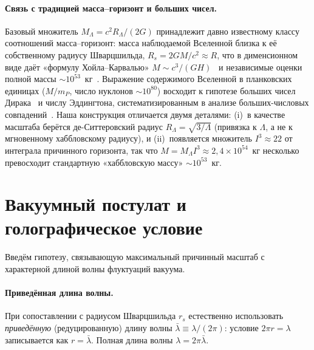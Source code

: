 \documentclass[12pt,a4paper]{article}
\begin{document}
\paragraph{Связь с традицией масса--горизонт и больших чисел.} Базовый множитель $M_\Lambda = c^2 R_\Lambda/(2G)$ принадлежит давно известному классу соотношений масса--горизонт: масса наблюдаемой Вселенной близка к её собственному радиусу Шварцшильда, $R_s = 2GM/c^2 \approx R$, что в дименсионном виде даёт «формулу Хойла--Карвалью» $M \sim c^3/(GH)$~\cite{Carvalho1995} и независимые оценки полной массы $\sim10^{53}$~кг~\cite{Valev2014}. Выражение содержимого Вселенной в планковских единицах ($M/m_P$, число нуклонов $\sim10^{80}$) восходит к гипотезе больших чисел Дирака~\cite{Dirac1938} и числу Эддингтона, систематизированным в анализе больших-числовых совпадений~\cite{CarrRees1979}. Наша конструкция отличается двумя деталями: (i)~в качестве масштаба берётся де-Ситтеровский радиус $R_\Lambda=\sqrt{3/\Lambda}$ (привязка к $\Lambda$, а не к мгновенному хаббловскому радиусу), и (ii)~появляется множитель $I^3\approx22$ от интеграла причинного горизонта, так что $M = M_\Lambda I^3 \approx 2{,}4\times10^{54}$~кг несколько превосходит стандартную «хаббловскую массу» $\sim10^{53}$~кг.


\section{Вакуумный постулат и голографическое условие}
\label{sec:vacuum}

Введём гипотезу, связывающую максимальный причинный масштаб с характерной длиной волны флуктуаций вакуума.

\paragraph{Приведённая длина волны.} При сопоставлении с радиусом Шварцшильда $r_s$ естественно использовать \emph{приведённую} (редуцированную) длину волны $\bar\lambda \equiv \lambda/(2\pi)$: условие $2\pi r = \lambda$ записывается как $r = \bar\lambda$. Полная длина волны $\lambda = 2\pi\bar\lambda$.
\end{document}
